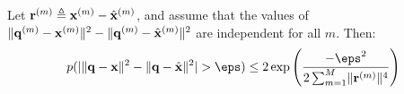 



\begin{lemma}
Let $\mathbf{r}^{(m)} \triangleq \mathbf{x}^{(m)} - \hat{\mathbf{x}}^{(m)}$, and assume that the values of $\lVert\mathbf{q}^{(m)} - \mathbf{x}^{(m)} \rVert^2 - \lVert\mathbf{q}^{(m)} - \hat{\mathbf{x}}^{(m)} \rVert^2$ are independent for all $m$. Then: %
\begin{align} \label{eq:l2_indep}
    p(\abs{ \norm{\q - \x}^2 - \norm{\q - \xhat}^2 } > \eps) \le
        2\exp \left( \frac{-\eps^2}{
            2 \sum_{m=1}^M \norm{\r^{(m)}}^4
        }\right)
\end{align}
\end{lemma}
